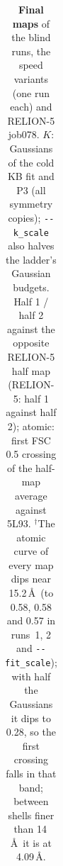 \begin{table}[!t]
{\begin{tabular}{@{}llrccccc@{}}
\bottomrule
\end{tabular}}
\caption{\textbf{Final maps} of the blind runs, the speed variants (one run each) and RELION-5 job078. $K$: Gaussians of the cold KB fit and P3 (all symmetry copies); \texttt{-{}-k\_scale} also halves the ladder's Gaussian budgets. Half 1 / half 2 against the opposite RELION-5 half map (RELION-5: half 1 against half 2); atomic: first FSC 0.5 crossing of the half-map average against 5L93.
$^\dagger$The atomic curve of every map dips near 15.2\,\AA\ (to 0.58, 0.58 and 0.57 in runs~1, 2 and \texttt{-{}-fit\_scale}); with half the Gaussians it dips to 0.28, so the first crossing falls in that band; between shells finer than 14\,\AA\ it is at 4.09\,\AA.}
\label{tab:suppl:runs}
\end{table}
